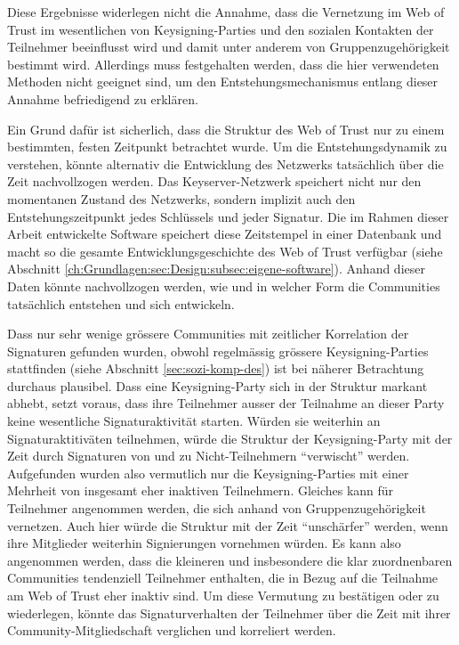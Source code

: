 Diese Ergebnisse widerlegen nicht die Annahme, dass die Vernetzung im
Web of Trust im wesentlichen von Keysigning-Parties und den sozialen
Kontakten der Teilnehmer beeinflusst wird und damit unter anderem von
Gruppenzugeh\"origkeit bestimmt wird. Allerdings muss festgehalten
werden, dass die hier verwendeten Methoden nicht geeignet sind, um den
Entstehungsmechanismus entlang dieser Annahme befriedigend zu
erkl\"aren. 

Ein Grund daf\"ur ist sicherlich, dass die Struktur des Web of Trust
nur zu einem bestimmten, festen Zeitpunkt betrachtet wurde. Um die
Entstehungsdynamik zu verstehen, k\"onnte alternativ die Entwicklung
des Netzwerks tats\"achlich \"uber die Zeit nachvollzogen werden. Das
Keyserver-Netzwerk speichert nicht nur den momentanen Zustand des
Netzwerks, sondern implizit auch den Entstehungszeitpunkt jedes
Schl\"ussels und jeder Signatur. Die im Rahmen dieser Arbeit
entwickelte Software speichert diese Zeitstempel in einer Datenbank
und macht so die gesamte Entwicklungsgeschichte des Web of Trust
verf\"ugbar (siehe Abschnitt
\ref{ch:Grundlagen:sec:Design:subsec:eigene-software}). Anhand dieser
Daten k\"onnte nachvollzogen werden, wie und in welcher Form die
Communities tats\"achlich entstehen und sich entwickeln.

Dass nur sehr wenige gr\"ossere Communities mit zeitlicher Korrelation
der Signaturen gefunden wurden, obwohl regelm\"assig gr\"ossere
Keysigning-Parties stattfinden (siehe Abschnitt
\ref{sec:sozi-komp-des}) ist bei n\"aherer Betrachtung durchaus
plausibel. Dass eine Keysigning-Party sich in der Struktur markant
abhebt, setzt voraus, dass ihre Teilnehmer ausser der Teilnahme an
dieser Party keine wesentliche Signaturaktivit\"at starten. W\"urden
sie weiterhin an Signaturaktitiv\"aten teilnehmen, w\"urde die
Struktur der Keysigning-Party mit der Zeit durch Signaturen von und zu
Nicht-Teilnehmern ``verwischt'' werden. Aufgefunden wurden also
vermutlich nur die Keysigning-Parties mit einer Mehrheit von insgesamt
eher inaktiven Teilnehmern. Gleiches kann f\"ur Teilnehmer angenommen
werden, die sich anhand von Gruppenzugeh\"origkeit vernetzen. Auch
hier w\"urde die Struktur mit der Zeit ``unsch\"arfer'' werden, wenn
ihre Mitglieder weiterhin Signierungen vornehmen w\"urden. Es kann
also angenommen werden, dass die kleineren und insbesondere die klar
zuordnenbaren Communities tendenziell Teilnehmer enthalten, die in
Bezug auf die Teilnahme am Web of Trust eher inaktiv sind. Um diese
Vermutung zu best\"atigen oder zu wiederlegen, k\"onnte das
Signaturverhalten der Teilnehmer \"uber die Zeit mit ihrer
Community-Mitgliedschaft verglichen und korreliert werden.

